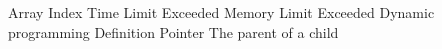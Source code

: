%
%


 Array 
 Index
 Time Limit Exceeded
 Memory Limit Exceeded
 Dynamic programming 
 Definition
 Pointer 
 The parent of a child
